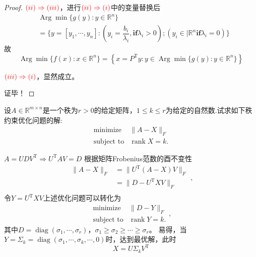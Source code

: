 \begin{problemset}
\begin{proof}
        $\color{red}{(ii)\Rightarrow(iii)}$，进行$\color{red}{(ii)\Rightarrow(i)}$中的变量替换后
        \[
            \begin{array}{ll}
                &\operatorname{Arg}\min\{g(y):y\in\mathbb{R}^{n}\}\\
                {}&=\{y = [y_1,\cdots, y_n]:(y_i=\dfrac{b_i}{\lambda_i},\textbf{if}\lambda_i>0);(y_i\in |\mathbb{R}^n\textbf{if}\lambda_i=0)\}
            \end{array}
        \]
        故
        \[
            \operatorname{Arg}\min\{f(x):x\in \mathbb{R}^n\} = \left\{x = P^{\mathrm{T}}y:y\in\operatorname{Arg}\min\{g(y):y\in\mathbb{R}^{n}\}\right\}
        \]
        

        $\color{red}{(iii)\Rightarrow(i)}$，显然成立。
        
        证毕！
    \end{proof}
    \item 设$A\in\mathbb{R}^{m\times n}$是一个秩为$r>0$的给定矩阵，$1\leq k\leq r$为给定的自然数.试求如下秩约束优化问题的解:
    \[
        \begin{array}{ll}
            \operatorname{minimize}&\|A-X\|_F\\
            \operatorname{subject\ to}&\operatorname{rank}X=k.
        \end{array}
    \]
    \begin{solution}
        $A = UDV^{\mathrm{T}}\Rightarrow U^{\mathrm{T}}AV = D$
        根据矩阵Frobenius范数的酉不变性
        \[
            \begin{array}{ll}
                \|A-X\|_F &= \|U^{\mathrm{T}}(A-X)V\|_F\\
                &=\|D-U^{\mathrm{T}}XV\|_F\\
            \end{array},
        \]
        令$Y = U^{\mathrm{T}}XV$上述优化问题可以转化为
        \[
            \begin{array}{ll}
                \operatorname{minimize}&\|D-Y\|_F\\
                \operatorname{subject\ to}&\operatorname{rank}Y=k.
            \end{array},
        \]
        其中$D = \operatorname{diag} (\sigma_1,\cdots,\sigma_r)$，$\sigma_1\geq\sigma_2\geq\cdots\geq\sigma_r$。
        易得，当$Y = \Sigma_k = \operatorname{diag} (\sigma_1,\cdots,\sigma_k,\cdots, 0)$时，达到最优解，此时
        \[
            X =  U\Sigma_kV^{\mathrm{T}}
        \]
    \end{solution}
  \end{problemset}